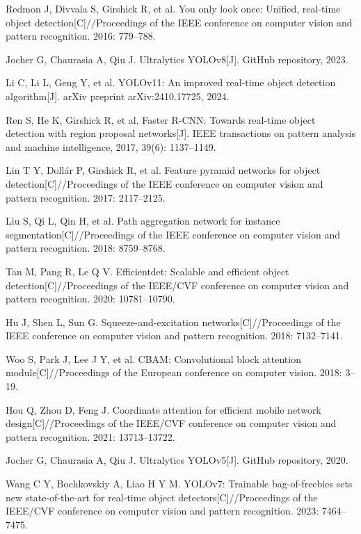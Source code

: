 \documentclass[12pt,a4paper]{article}
\begin{document}
\begin{enumerate}[label={[\arabic*]}, noitemsep]
  \item Redmon J, Divvala S, Girshick R, et al. You only look once: Unified, real-time object detection[C]//Proceedings of the IEEE conference on computer vision and pattern recognition. 2016: 779--788.
  \item Jocher G, Chaurasia A, Qiu J. Ultralytics YOLOv8[J]. GitHub repository, 2023.
  \item Li C, Li L, Geng Y, et al. YOLOv11: An improved real-time object detection algorithm[J]. arXiv preprint arXiv:2410.17725, 2024.
  \item Ren S, He K, Girshick R, et al. Faster R-CNN: Towards real-time object detection with region proposal networks[J]. IEEE transactions on pattern analysis and machine intelligence, 2017, 39(6): 1137--1149.
  \item Lin T Y, Dollár P, Girshick R, et al. Feature pyramid networks for object detection[C]//Proceedings of the IEEE conference on computer vision and pattern recognition. 2017: 2117--2125.
  \item Liu S, Qi L, Qin H, et al. Path aggregation network for instance segmentation[C]//Proceedings of the IEEE conference on computer vision and pattern recognition. 2018: 8759--8768.
  \item Tan M, Pang R, Le Q V. Efficientdet: Scalable and efficient object detection[C]//Proceedings of the IEEE/CVF conference on computer vision and pattern recognition. 2020: 10781--10790.
  \item Hu J, Shen L, Sun G. Squeeze-and-excitation networks[C]//Proceedings of the IEEE conference on computer vision and pattern recognition. 2018: 7132--7141.
  \item Woo S, Park J, Lee J Y, et al. CBAM: Convolutional block attention module[C]//Proceedings of the European conference on computer vision. 2018: 3--19.
  \item Hou Q, Zhou D, Feng J. Coordinate attention for efficient mobile network design[C]//Proceedings of the IEEE/CVF conference on computer vision and pattern recognition. 2021: 13713--13722.
  \item Jocher G, Chaurasia A, Qiu J. Ultralytics YOLOv5[J]. GitHub repository, 2020.
  \item Wang C Y, Bochkovskiy A, Liao H Y M. YOLOv7: Trainable bag-of-freebies sets new state-of-the-art for real-time object detectors[C]//Proceedings of the IEEE/CVF conference on computer vision and pattern recognition. 2023: 7464--7475.
\end{enumerate}
\end{document}
